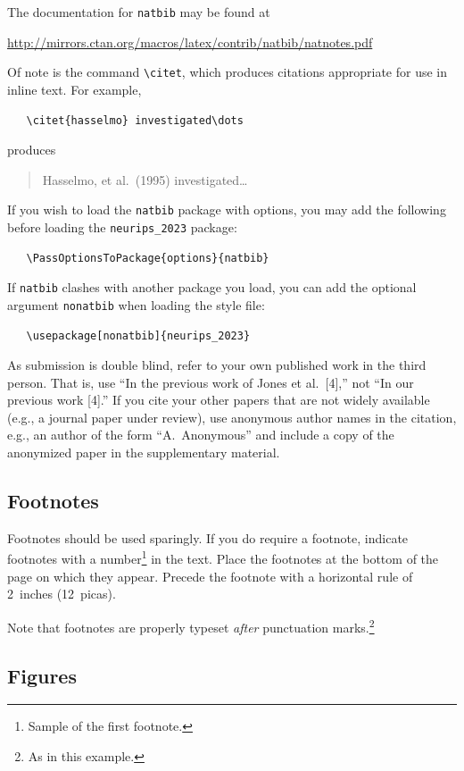 \documentclass{article}
\begin{document}
The documentation for \verb+natbib+ may be found at
\begin{center}
  \url{http://mirrors.ctan.org/macros/latex/contrib/natbib/natnotes.pdf}
\end{center}
Of note is the command \verb+\citet+, which produces citations appropriate for
use in inline text.  For example,
\begin{verbatim}
   \citet{hasselmo} investigated\dots
\end{verbatim}
produces
\begin{quote}
  Hasselmo, et al.\ (1995) investigated\dots
\end{quote}


If you wish to load the \verb+natbib+ package with options, you may add the
following before loading the \verb+neurips_2023+ package:
\begin{verbatim}
   \PassOptionsToPackage{options}{natbib}
\end{verbatim}


If \verb+natbib+ clashes with another package you load, you can add the optional
argument \verb+nonatbib+ when loading the style file:
\begin{verbatim}
   \usepackage[nonatbib]{neurips_2023}
\end{verbatim}


As submission is double blind, refer to your own published work in the third
person. That is, use ``In the previous work of Jones et al.\ [4],'' not ``In our
previous work [4].'' If you cite your other papers that are not widely available
(e.g., a journal paper under review), use anonymous author names in the
citation, e.g., an author of the form ``A.\ Anonymous'' and include a copy of the anonymized paper in the supplementary material.


\subsection{Footnotes}


Footnotes should be used sparingly.  If you do require a footnote, indicate
footnotes with a number\footnote{Sample of the first footnote.} in the
text. Place the footnotes at the bottom of the page on which they appear.
Precede the footnote with a horizontal rule of 2~inches (12~picas).


Note that footnotes are properly typeset \emph{after} punctuation
marks.\footnote{As in this example.}


\subsection{Figures}
\end{document}

